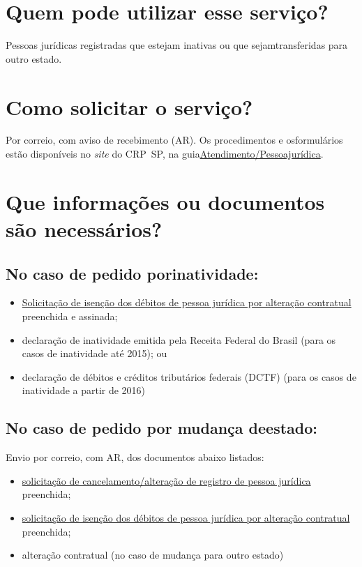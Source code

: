 \section{Quem pode utilizar esse serviço?}

Pessoas jurídicas registradas que estejam inativas ou que sejamtransferidas para outro estado.

\section{Como solicitar o serviço?}

Por correio, com aviso de recebimento (AR). Os procedimentos e osformulários estão disponíveis no \emph{site} do CRP~SP, na guia\href{https://www.crpsp.org/pagina/view/30}{Atendimento/Pessoajurídica}.

\section{Que informações ou documentos são necessários?}

\subsection{No caso de pedido porinatividade:}

\begin{itemize}
  \item  \hyperref[]{Solicitação  de isenção dos débitos de pessoa jurídica por alteração contratual}  preenchida e assinada;
  \item  declaração de inatividade emitida pela Receita Federal do Brasil (para  os casos de inatividade até 2015); ou
  \item  declaração de débitos e créditos tributários federais (DCTF) (para os  casos de inatividade a partir de 2016)
\end{itemize}

\subsection{No caso de pedido por mudança deestado:}

Envio por correio, com AR, dos documentos abaixo listados:

\begin{itemize}
  \item  \hyperref[]{solicitação  de cancelamento/alteração de registro de pessoa jurídica} preenchida;
  \item  \hyperref[]{solicitação  de isenção dos débitos de pessoa jurídica por alteração contratual}  preenchida;
  \item  alteração contratual (no caso de mudança para outro estado)
\end{itemize}


